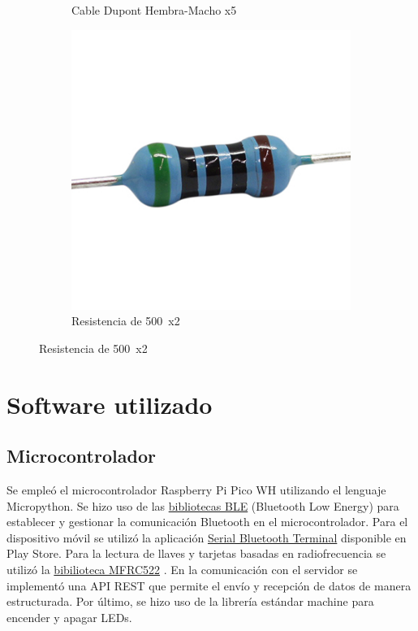 \documentclass{article}
\begin{document}
\begin{figure}[H]
\begin{subfigure}[b]{0.3\textwidth}
		\caption*{Cable Dupont Hembra-Macho x5}
		\label{fig:cable mh}
	\end{subfigure}
	\hfill
	\begin{subfigure}[b]{0.3\textwidth}
		\includegraphics[width=\textwidth]{../images/resistencia.jpg}
		\caption*{Resistencia de 500\textOmega\ x2}
		\label{fig:resistencia}
	\end{subfigure}
\end{figure}


\section{Software utilizado}
\subsection{Microcontrolador}
Se empleó el microcontrolador Raspberry Pi Pico WH utilizando el lenguaje Micropython.
Se hizo uso de las \href{https://github.com/micropython/micropython/tree/master/examples/bluetooth}{bibliotecas BLE} (Bluetooth Low Energy)\cite{micropythonBluetoothExamples} para establecer y gestionar la comunicación Bluetooth en el microcontrolador. 
Para el dispositivo móvil se utilizó la aplicación \href{https://play.google.com/store/apps/details?id=de.kai_morich.serial_usb_terminal&pcampaignid=web_share}{Serial Bluetooth Terminal}\cite{sam2023ble} disponible en Play Store. Para la lectura de llaves y tarjetas basadas en radiofrecuencia se utilizó la \href{https://github.com/danjperron/micropython-mfrc522/blob/master/mfrc522.py}{bibilioteca MFRC522} \cite{danjperron2022mfrc522}.
En la comunicación con el servidor se implementó una API REST que permite el envío y recepción de datos de manera estructurada. Por último, se hizo uso de la librería estándar machine para encender y apagar LEDs.
\end{document}
